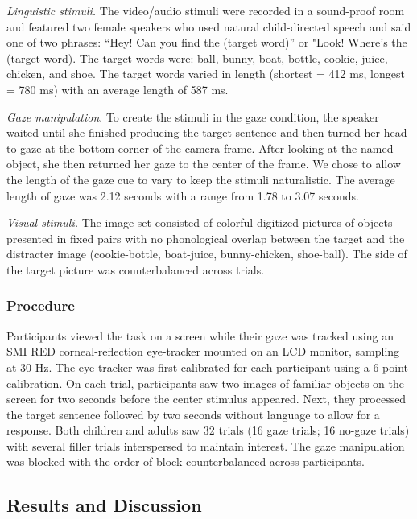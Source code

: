 \documentclass[10pt, letterpaper]{article}
\begin{document}
\emph{Linguistic stimuli.} The video/audio stimuli were recorded in a
sound-proof room and featured two female speakers who used natural
child-directed speech and said one of two phrases: ``Hey! Can you find
the (target word)'' or "Look! Where's the (target word). The target
words were: ball, bunny, boat, bottle, cookie, juice, chicken, and shoe.
The target words varied in length (shortest = 412 ms, longest = 780 ms)
with an average length of 587 ms.

\emph{Gaze manipulation}. To create the stimuli in the gaze condition,
the speaker waited until she finished producing the target sentence and
then turned her head to gaze at the bottom corner of the camera frame.
After looking at the named object, she then returned her gaze to the
center of the frame. We chose to allow the length of the gaze cue to
vary to keep the stimuli naturalistic. The average length of gaze was
2.12 seconds with a range from 1.78 to 3.07 seconds.

\emph{Visual stimuli.} The image set consisted of colorful digitized
pictures of objects presented in fixed pairs with no phonological
overlap between the target and the distracter image (cookie-bottle,
boat-juice, bunny-chicken, shoe-ball). The side of the target picture
was counterbalanced across trials.

\hypertarget{procedure}{%
\subsubsection{Procedure}\label{procedure}}

Participants viewed the task on a screen while their gaze was tracked
using an SMI RED corneal-reflection eye-tracker mounted on an LCD
monitor, sampling at 30 Hz. The eye-tracker was first calibrated for
each participant using a 6-point calibration. On each trial,
participants saw two images of familiar objects on the screen for two
seconds before the center stimulus appeared. Next, they processed the
target sentence followed by two seconds without language to allow for a
response. Both children and adults saw 32 trials (16 gaze trials; 16
no-gaze trials) with several filler trials interspersed to maintain
interest. The gaze manipulation was blocked with the order of block
counterbalanced across participants.

\hypertarget{results-and-discussion}{%
\subsection{Results and Discussion}\label{results-and-discussion}}
\end{document}
